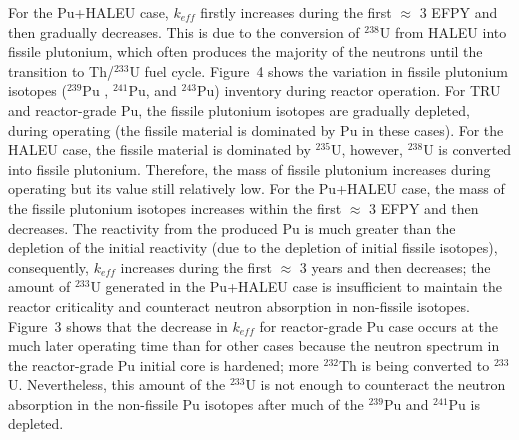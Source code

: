 \documentclass[answers,11pt]{exam}
\begin{document}
\begin{questions}
\begin{solution}
                 For the Pu+HALEU case, $k_{eff}$ firstly increases during the 
                 first $\approx$ $3$ EFPY and then gradually decreases. This 
                 is due to the conversion of $^{238}$U from HALEU into fissile 
                 plutonium, which often produces the majority of the neutrons 
                 until the transition to Th/$^{233}$U fuel cycle. Figure~4 
                 shows the variation in fissile plutonium isotopes ($^{239}$Pu 
                , $^{241}$Pu, and $^{243}$Pu) inventory during reactor 
                 operation. For TRU and reactor-grade Pu, the fissile 
                 plutonium isotopes are gradually depleted, during operating 
                 (the fissile material is dominated by Pu in these cases). For 
                 the HALEU case, the fissile material is dominated by 
                 $^{235}$U, 
                 however, $^{238}$U is converted into fissile plutonium. 
                 Therefore, the mass of fissile plutonium increases during 
                 operating but its value still relatively low. For the 
                 Pu+HALEU case, the mass of the fissile plutonium isotopes 
                 increases 
                 within the first $\approx$ $3$ EFPY and then decreases. The 
                 reactivity from the produced Pu is much greater than the 
                 depletion of the initial reactivity (due to the depletion of 
                 initial fissile isotopes), consequently, $k_{eff}$ increases 
                 during the first $\approx$ $3$ years and then decreases; the 
                 amount of $^{233}$U generated in the Pu+HALEU case is 
                 insufficient to maintain the reactor criticality and 
                 counteract neutron absorption in non-fissile isotopes.\\
                 
                 Figure~3 shows that the decrease in $k_{eff}$ for reactor-grade Pu case occurs at the much later operating time than for other cases because the neutron spectrum in the reactor-grade Pu initial core is hardened; more $^{232}$Th is being converted to $^{233}$U. Nevertheless, this amount of the $^{233}$U is not enough to counteract the neutron absorption in the non-fissile Pu isotopes after much of the $^{239}$Pu and $^{241}$Pu is depleted.
                 
        \end{solution}


\end{questions}
\end{document}
